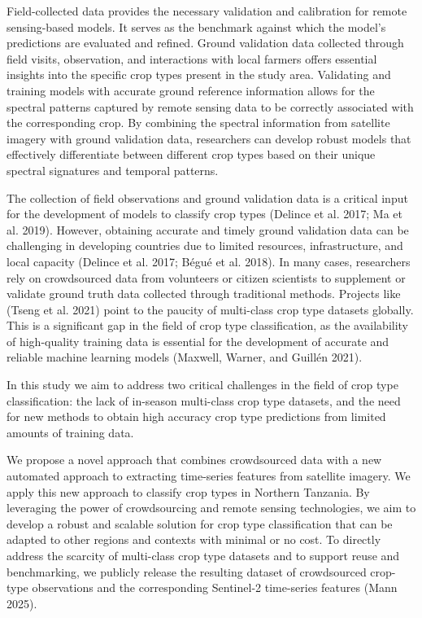 \documentclass[
  journal,
  twocolumn]{IEEEtran}
\begin{document}
Field-collected data provides the necessary validation and calibration
for remote sensing-based models. It serves as the benchmark against
which the model's predictions are evaluated and refined. Ground
validation data collected through field visits, observation, and
interactions with local farmers offers essential insights into the
specific crop types present in the study area. Validating and training
models with accurate ground reference information allows for the
spectral patterns captured by remote sensing data to be correctly
associated with the corresponding crop. By combining the spectral
information from satellite imagery with ground validation data,
researchers can develop robust models that effectively differentiate
between different crop types based on their unique spectral signatures
and temporal patterns.

The collection of field observations and ground validation data is a
critical input for the development of models to classify crop types
(Delince et al. 2017; Ma et al. 2019). However, obtaining accurate and
timely ground validation data can be challenging in developing countries
due to limited resources, infrastructure, and local capacity (Delince et
al. 2017; Bégué et al. 2018). In many cases, researchers rely on
crowdsourced data from volunteers or citizen scientists to supplement or
validate ground truth data collected through traditional methods.
Projects like (Tseng et al. 2021) point to the paucity of multi-class
crop type datasets globally. This is a significant gap in the field of
crop type classification, as the availability of high-quality training
data is essential for the development of accurate and reliable machine
learning models (Maxwell, Warner, and Guillén 2021).

In this study we aim to address two critical challenges in the field of
crop type classification: the lack of in-season multi-class crop type
datasets, and the need for new methods to obtain high accuracy crop type
predictions from limited amounts of training data.

We propose a novel approach that combines crowdsourced data with a new
automated approach to extracting time-series features from satellite
imagery. We apply this new approach to classify crop types in Northern
Tanzania. By leveraging the power of crowdsourcing and remote sensing
technologies, we aim to develop a robust and scalable solution for crop
type classification that can be adapted to other regions and contexts
with minimal or no cost. To directly address the scarcity of multi-class
crop type datasets and to support reuse and benchmarking, we publicly
release the resulting dataset of crowdsourced crop-type observations and
the corresponding Sentinel-2 time-series features (Mann 2025).
\end{document}
